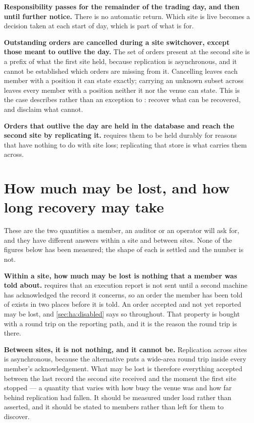 \textbf{Responsibility passes for the remainder of the trading day, and then
until further notice.} There is no automatic return. Which site is live becomes a
decision taken at each start of day, which is part of what
 is for.

\textbf{Outstanding orders are cancelled during a site switchover, except
those meant to outlive the day.} The set of orders present at the second site
is a prefix of what the first site held, because replication is asynchronous,
and it cannot be established which orders are missing from it. Cancelling
leaves each member with a position it can state exactly; carrying an unknown
subset across leaves every member with a position neither it nor the venue can
state. This is the case  describes rather than an exception to
: recover what can be recovered, and disclaim what cannot.

\textbf{Orders that outlive the day are held in the database and reach the second
site by replicating it.}  requires them to be
held durably for reasons that have nothing to do with site loss; replicating that
store is what carries them across.

\section{How much may be lost, and how long recovery may take}
\label{sec:dr:rpo_rto}

These are the two quantities a member, an auditor or an operator will ask for,
and they have different answers within a site and between sites. None of the
figures below has been measured; the shape of each is settled and the number is
not.

\textbf{Within a site, how much may be lost is nothing that a member was told
about.}  requires that an execution report
is not sent until a second machine has acknowledged the record it concerns, so an
order the member has been told of exists in two places before it is told. An
order accepted and not yet reported may be lost, and \cref{sec:ha:disabled} says
so throughout. That property is bought with a round trip on the reporting path,
and it is the reason the round trip is there.

\textbf{Between sites, it is not nothing, and it cannot be.} Replication across
sites is asynchronous, because the alternative puts a wide-area round trip inside
every member's acknowledgement. What may be lost is therefore everything
accepted between the last record the second site received and the moment the
first site stopped --- a quantity that varies with how busy the venue was and how
far behind replication had fallen. It should be measured under load rather than
asserted, and it should be stated to members rather than left for them to
discover.

